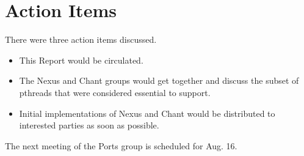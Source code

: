 \section{Action Items}

There were three action items discussed.
\begin{itemize}
\item This Report would be circulated.

\item The Nexus and Chant groups would get together and discuss
the subset of pthreads that were considered essential to support.

\item Initial implementations of Nexus and Chant would be distributed
to interested parties as soon as possible.

\end{itemize}
The next meeting of the Ports group is scheduled for Aug. 16.





